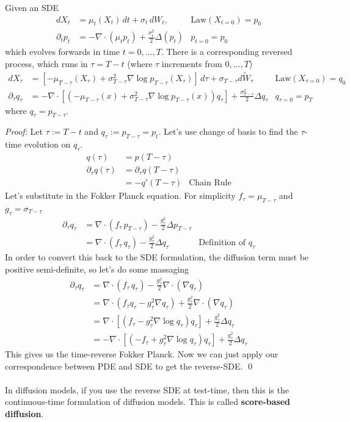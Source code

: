 \begin{theorem}
	Given an SDE 
	\begin{align}
		dX_t & = \mu_t(X_t) \, dt + \sigma_t \, dW_t,  & \text{Law}(X_{t=0})  = p_0\\
		\partial_t p_t & = - \nabla \cdot (\mu_t p_t) + \frac{\sigma_t^2}{2} \Delta ( p_t) & p_{t=0} = p_0
	\end{align}
	which evolves forwards in time $t = 0,..., T$.  There is a corresponding reversed process, which runs in $\tau = T - t$ (where $\tau$ increments from $0, ..., T$)
	\begin{align}
		dX_\tau &= [-\mu_{T-\tau}(X_\tau) + \sigma_{T-\tau}^2 \nabla \log p_{T-\tau}(X_\tau)] \, d\tau + \sigma_{T-\tau} d \tilde W_\tau & \text{Law}(X_{\tau=0}) = q_0\\
		\partial_\tau q_\tau & = - \nabla \cdot [(-\mu_{T-\tau}(x) + \sigma_{T-\tau}^2 \nabla \log p_{T-\tau}(x)) q_\tau] + \frac{\sigma_{T-\tau}^2}{2} \Delta q_\tau & q_{\tau=0} = p_T
 	\end{align}
 	where $q_{\tau} = p_{T-\tau}$.
\end{theorem}
\emph{Proof:} Let $\tau := T-t$ and $q_\tau := p_{T-\tau} = p_{t}$. Let's use change of basis to find the $\tau$-time evolution on $q_\tau$.
\begin{align}
	q(\tau) & = p(T-\tau)\\
	\partial_\tau q(\tau) & = \partial_\tau q(T-\tau) \\
	& = - q'(T-\tau)  & \text{Chain Rule}
\end{align}
Let's substitute in the Fokker Planck equation. For simplicity $f_{\tau} = \mu_{T-\tau}$ and $g_{\tau} = \sigma_{T-\tau}$
\begin{align}
	\partial_\tau q_\tau & = \nabla \cdot(f_\tau \, p_{T-\tau}) - \frac{g_\tau^2}{2} \Delta p_{T-\tau} \\
	& = \nabla \cdot(f_\tau \, q_\tau) - \frac{g_\tau^2}{2} \Delta q_\tau & \text{Definition of } q_\tau
\end{align}
In order to convert this back to the SDE formulation, the diffusion term must be positive semi-definite, so let's do some massaging
\begin{align}
	\partial_\tau q_\tau & = \nabla \cdot(f_\tau \, q_\tau) - \frac{g_\tau^2}{2} \nabla \cdot (\nabla q_\tau)\\
	& = \nabla \cdot \left(f_\tau q_\tau - g_\tau^2 \nabla q_\tau \right) + \frac{g_\tau^2}{2} \nabla \cdot (\nabla q_\tau)\\
	& = \nabla \cdot [(f_\tau - g_\tau^2 \nabla \log q_\tau)q_\tau] + \frac{g_\tau^2}{2} \Delta q_\tau\\
	& = - \nabla \cdot [(-f_\tau + g_\tau^2 \nabla \log q_\tau)q_\tau] + \frac{g_\tau^2}{2} \Delta q_\tau
\end{align}
This gives us the time-reverse Fokker Planck. Now we can just apply our correspondence between PDE and SDE to get the reverse-SDE. \qed
\\
\\
In diffusion models, if you use the reverse SDE at test-time, then this is the continuous-time formulation of diffusion models. This is called \textbf{score-based diffusion}.

